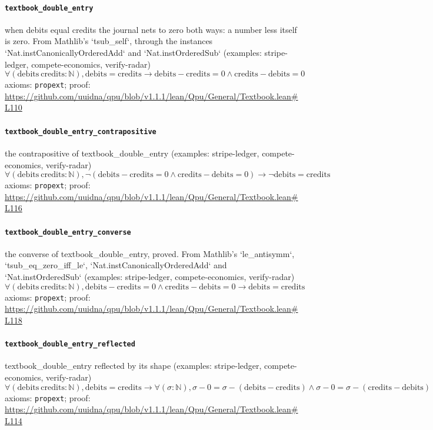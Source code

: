 \documentclass[11pt]{article}
\begin{document}
\paragraph{\texttt{textbook\_double\_entry}}
when debits equal credits the journal nets to zero both ways: a number less itself is zero. From Mathlib's `tsub\_self`, through the instances `Nat.instCanonicallyOrderedAdd` and `Nat.instOrderedSub` (examples: stripe-ledger, compete-economics, verify-radar)
\[ \forall (\mathrm{debits}\ \mathrm{credits} : \mathbb{N}), \mathrm{debits} = \mathrm{credits} \to \mathrm{debits} - \mathrm{credits} = 0 \land \mathrm{credits} - \mathrm{debits} = 0 \]
\noindent axioms: \texttt{propext}; proof: \url{https://github.com/uuidna/qpu/blob/v1.1.1/lean/Qpu/General/Textbook.lean\#L110}

\paragraph{\texttt{textbook\_double\_entry\_contrapositive}}
the contrapositive of textbook\_double\_entry (examples: stripe-ledger, compete-economics, verify-radar)
\[ \forall (\mathrm{debits}\ \mathrm{credits} : \mathbb{N}), \neg (\mathrm{debits} - \mathrm{credits} = 0 \land \mathrm{credits} - \mathrm{debits} = 0) \to \neg \mathrm{debits} = \mathrm{credits} \]
\noindent axioms: \texttt{propext}; proof: \url{https://github.com/uuidna/qpu/blob/v1.1.1/lean/Qpu/General/Textbook.lean\#L116}

\paragraph{\texttt{textbook\_double\_entry\_converse}}
the converse of textbook\_double\_entry, proved. From Mathlib's `le\_antisymm`, `tsub\_eq\_zero\_iff\_le`, `Nat.instCanonicallyOrderedAdd` and `Nat.instOrderedSub` (examples: stripe-ledger, compete-economics, verify-radar)
\[ \forall (\mathrm{debits}\ \mathrm{credits} : \mathbb{N}), \mathrm{debits} - \mathrm{credits} = 0 \land \mathrm{credits} - \mathrm{debits} = 0 \to \mathrm{debits} = \mathrm{credits} \]
\noindent axioms: \texttt{propext}; proof: \url{https://github.com/uuidna/qpu/blob/v1.1.1/lean/Qpu/General/Textbook.lean\#L118}

\paragraph{\texttt{textbook\_double\_entry\_reflected}}
textbook\_double\_entry reflected by its shape (examples: stripe-ledger, compete-economics, verify-radar)
\[ \forall (\mathrm{debits}\ \mathrm{credits} : \mathbb{N}), \mathrm{debits} = \mathrm{credits} \to \forall (\sigma : \mathbb{N}), \sigma - 0 = \sigma - (\mathrm{debits} - \mathrm{credits}) \land \sigma - 0 = \sigma - (\mathrm{credits} - \mathrm{debits}) \]
\noindent axioms: \texttt{propext}; proof: \url{https://github.com/uuidna/qpu/blob/v1.1.1/lean/Qpu/General/Textbook.lean\#L114}
\end{document}

